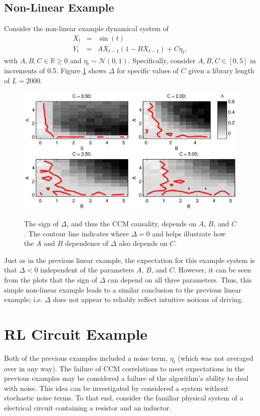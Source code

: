 \documentclass[twocolumn,aps,pre,groupedaddress]{revtex4-1}
\begin{document}
\subsection{Non-Linear Example}
Consider the non-linear example dynamical system of
\begin{eqnarray}
\label{eqn:nonlinearEX}
X_t &=& \sin(t)\\
Y_t &=& AX_{t-1}\left(1-BX_{t-1}\right)+C\eta_t,
\end{eqnarray}
with $A,B,C\in\mathbb{R}\ge 0$ and $\eta_t\sim\mathcal{N}\left(0,1\right)$.  Specifically, consider $A,B,C\in[0,5]$ in increments of 0.5.  Figure \ref{fig:nonlinearex} shows $\Delta$ for specific values of $C$ given a library length of $L=2000$.
\begin{figure}[ht]
\includegraphics[scale=0.55]{NonLinearEx.eps} \\
\caption{The sign of $\Delta$, and thus the CCM causality, depends on $A$, $B$, and $C$. The contour line indicates where $\Delta=0$ and helps illustrate how the $A$ and $B$ dependence of $\Delta$ also depends on $C$.}
\label{fig:nonlinearex}
\end{figure}
Just as in the previous linear example, the expectation for this example system is that $\Delta<0$ independent of the parameters $A$, $B$, and $C$.  However, it can be seen from the plots that the sign of $\Delta$ can depend on all three parameters.  Thus, this simple non-linear example leads to a similar conclusion to the previous linear example; i.e. $\Delta$ does not appear to reliably reflect intuitive notions of driving.

\section{RL Circuit Example}
\label{sec:rlcirc}
Both of the previous examples included a noise term, $\eta_t$ (which was not averaged over in any way).  The failure of CCM correlations to meet expectations in the previous examples may be considered a failure of the algorithm's ability to deal with noise.  This idea can be investigated by considered a system without stochastic noise terms.  To that end, consider the familiar physical system of a electrical circuit containing a resistor and an inductor.
\end{document}

